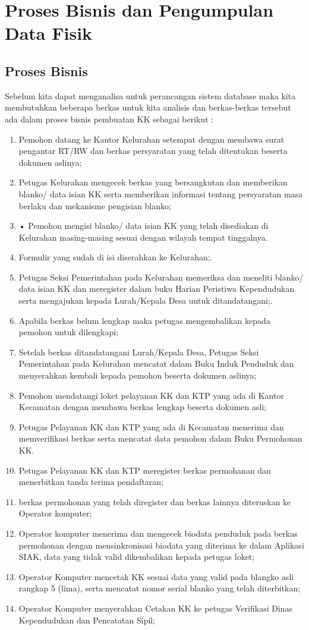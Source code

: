 \chapter{Proses Bisnis dan Pengumpulan Data Fisik}

\section{Proses Bisnis}
Sebelum kita dapat menganalisa untuk perancangan sistem database maka kita membutuhkan beberapa berkas untuk kita analisis dan berkas-berkas tersebut ada dalam proses bisnis pembuatan KK sebagai berikut :
\begin{enumerate}
	\item Pemohon datang ke Kantor Kelurahan setempat dengan membawa surat pengantar RT/RW dan berkas persyaratan yang telah ditentukan beserta dokumen aslinya;
	\item Petugas Kelurahan mengecek berkas yang bersangkutan dan memberikan blanko/ data isian KK serta memberikan informasi tentang persyaratan masa berlaku dan mekanisme pengisian blanko;
	\item •	Pemohon mengisi blanko/ data isian KK yang telah disediakan di Kelurahan masing-masing sesuai dengan wilayah tempat tinggalnya.
	\item Formulir yang sudah di isi diserahkan ke Kelurahan;.
    \item Petugas Seksi Pemerintahan pada Kelurahan memeriksa dan meneliti blanko/ data isian KK dan meregister dalam buku Harian Peristiwa Kependudukan serta mengajukan kepada Lurah/Kepala Desa untuk ditandatangani;.
    \item Apabila berkas belum lengkap maka petugas mengembalikan kepada pemohon untuk dilengkapi;
    \item Setelah berkas ditandatangani Lurah/Kepala Desa, Petugas Seksi Pemerintahan pada Kelurahan mencatat dalam Buku Induk Penduduk dan menyerahkan kembali kepada pemohon beserta dokumen aslinya;
    \item Pemohon mendatangi loket pelayanan KK dan KTP yang ada di Kantor Kecamatan dengan membawa berkas lengkap beserta dokumen asli;
    \item Petugas Pelayanan KK dan KTP yang ada di Kecamatan menerima dan memverifikasi berkas serta mencatat data pemohon dalam Buku Permohonan KK.
    \item Petugas Pelayanan KK dan KTP meregister berkas permohanan dan menerbitkan tanda terima pendaftaran;
    \item berkas permohonan yang telah diregister dan berkas lainnya diteruskan ke Operator komputer;
    \item Operator komputer menerima dan mengecek biodata penduduk pada berkas permohonan dengan mensinkronisasi biodata yang diterima ke dalam Aplikasi SIAK, data yang tidak valid dikembalikan kepada petugas loket;
    \item Operator Komputer mencetak KK sesuai data yang valid pada blangko asli rangkap 5 (lima), serta mencatat nomor serial blanko yang telah diterbitkan;
    \item Operator Komputer menyerahkan Cetakan KK ke petugas Verifikasi Dinas Kependudukan dan Pencatatan Sipil;
	

\end{enumerate}
